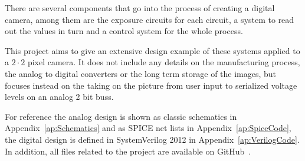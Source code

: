 
There are several components that go into the process of creating a digital camera,
among them are the exposure circuits for each circuit, a system to read out the values in turn
and a control system for the whole process.

This project aims to give an extensive design example of these systems applied to a $2 \cdot 2$ pixel camera.
It does not include any details on the manufacturing process, the analog to digital converters or the long term storage of the images, but focuses instead
on the taking on the picture from user input to serialized voltage levels on an analog 2 bit buss.

For reference the analog design is shown as classic schematics in Appendix~\ref{ap:Schematics} and as SPICE net lists in Appendix~\ref{ap:SpiceCode}, the digital design is defined in SystemVerilog 2012 in Appendix~\ref{ap:VerilogCode}.
In addition, all files related to the project are available on GitHub~\cite{githubProject}.
